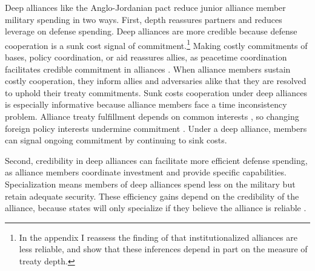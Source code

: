 \documentclass[12pt]{article}
\begin{document}
Deep alliances like the Anglo-Jordanian pact reduce junior alliance member military spending in two ways. 
First, depth reassures partners and reduces leverage on defense spending.  
Deep alliances are more credible because defense cooperation is a sunk cost signal of commitment.\footnote{In the appendix I reassess the finding of \citet{LeedsAnac2005} that institutionalized alliances are less reliable, and show that these inferences depend in part on the measure of treaty depth.}
Making costly commitments of bases, policy coordination, or aid reassures allies, as peacetime coordination facilitates credible commitment in alliances \citep{Morrow1994}. 
When alliance members sustain costly cooperation, they inform allies and adversaries alike that they are resolved to uphold their treaty commitments. 
Sunk costs cooperation under deep alliances is especially informative because alliance members face a time inconsistency problem. 
Alliance treaty fulfillment depends on common interests \citep{Morrow2000, Leeds2003a}, so changing foreign policy interests undermine commitment \citep{LeedsSavun2007}. 
Under a deep alliance, members can signal ongoing commitment by continuing to sink costs.  


Second, credibility in deep alliances can facilitate more efficient defense spending, as alliance members coordinate investment and provide specific capabilities. 
Specialization means members of deep alliances spend less on the military but retain adequate security.
These efficiency gains depend on the credibility of the alliance, because states will only specialize if they believe the alliance is reliable \citep{Leeds2003a}.  
\end{document}
